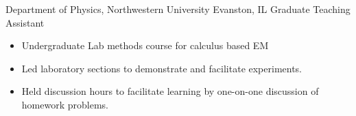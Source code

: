 
        {Department of Physics, Northwestern University}
        {Evanston, IL}
        {Graduate Teaching Assistant}
        {}{
    \begin{itemize}
    	\item Undergraduate Lab methods course for calculus based EM
        \item Led laboratory sections to demonstrate and facilitate experiments. 
        \item Held discussion hours to facilitate learning by one-on-one discussion of homework problems.
    \end{itemize}
}
